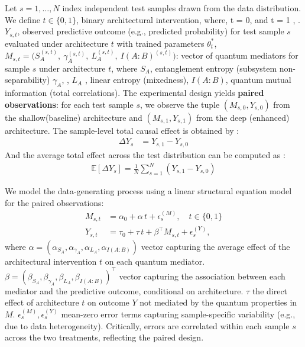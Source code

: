 \documentclass[
    reprint,
    amsmath, amssymb,
    aps,
    floatfix,
    nofootinbib
]{revtex4-1}
\begin{document}
Let $s = 1, \dots, N$ index independent test samples drawn from the data distribution. We define $t \in \{0,1\}$,  binary architectural intervention, where, t = 0,   and t = 1 , .
$Y_{s,t}$,  observed predictive outcome (e.g., predicted probability) for test sample $s$ evaluated under architecture $t$ with trained parameters $\theta^*_t$,  $M_{s,t} = \bigl(S_A^{(s,t)},\ \gamma_A^{(s,t)},\ L_A^{(s,t)},\ I(A:B)^{(s,t)}\bigr)$: vector of quantum mediators for sample $s$ under architecture $t$, where $ S_A$, entanglement entropy (subsystem non-separability) $\gamma_A $, ,  $L_A$ , linear entropy (mixedness),  $I(A:B)$, quantum mutual information (total correlations). The experimental design yields \textbf{paired observations}: for each test sample $s$, we observe the tuple $(M_{s,0}, Y_{s,0})$ from the shallow(baseline) architecture and $(M_{s,1}, Y_{s,1})$ from the deep (enhanced) architecture. The sample-level total causal effect is obtained by :
\begin{align}
    \Delta Y_s &= Y_{s,1} - Y_{s,0} \label{eq:indivTE}
\end{align}
And the average total effect across the test distribution can be computed as :
\begin{align}
    \mathbb{E}[\Delta Y_s] = \frac{1}{N} \sum_{s=1}^{N} (Y_{s,1} - Y_{s,0}) \label{eq:popTE}
\end{align}

We model the data-generating process using a linear structural equation model for the paired observations:
\begin{align}
    M_{s,t} &= \alpha_0 + \alpha \, t + \epsilon_s^{(M)}, \quad t \in \{0,1\} \label{eq:Meq} \\
    Y_{s,t} &= \tau_0 + \tau \, t + \beta^\top M_{s,t} + \epsilon_s^{(Y)}, \label{eq:Yeq}
\end{align}
where $\alpha = (\alpha_{S_A}, \alpha_{\gamma_A}, \alpha_{L_A}, \alpha_{I(A:B)})$ vector capturing the average effect of the architectural intervention $t$ on each quantum mediator. $\beta = (\beta_{S_A}, \beta_{\gamma_A}, \beta_{L_A}, \beta_{I(A:B)})^\top$ vector capturing the association between each mediator and the predictive outcome, conditional on architecture. $\tau$ the direct effect of architecture $t$ on outcome $Y$ not mediated by the quantum properties in $M$. $\epsilon_s^{(M)}, \epsilon_s^{(Y)}$ mean-zero error terms capturing sample-specific variability (e.g., due to data heterogeneity). Critically, errors are correlated within each sample $s$ across the two treatments, reflecting the paired design.
\end{document}
